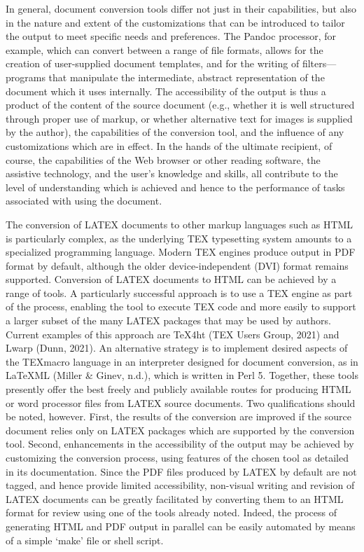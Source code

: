 \documentclass[11pt]{sig-alternate}
\begin{document}
\begin{large}
In general, document conversion tools differ not just in their capabilities, but also in the nature and extent of the customizations that can be introduced to tailor the output to meet specific needs and preferences. The Pandoc processor, for example, which can convert between a range of file formats, allows for the creation of user-supplied document templates, and for the writing of filters—programs that manipulate the intermediate, abstract representation of the document which it uses internally. The accessibility of the output is thus a product of the content of the source document (e.g., whether it is well structured through proper use of markup, or whether alternative text for images is supplied by the author), the capabilities of the conversion tool, and the influence of any customizations which are in effect. In the hands of the ultimate recipient, of course, the capabilities of the Web browser or other reading software, the assistive technology, and the user’s knowledge and skills, all contribute to the level of understanding which is achieved and hence to the performance of tasks associated with using the document.

The conversion of LATEX documents to other markup languages such as HTML is particularly complex, as the underlying TEX typesetting system amounts to a specialized programming language. Modern TEX engines produce output in PDF format by default, although the older device-independent (DVI) format remains supported. Conversion of LATEX documents to HTML can be achieved by a range of tools. A particularly successful approach is to use a TEX engine as part of the process, enabling the tool to execute TEX code and more easily to support a larger subset of the many LATEX packages that may be used by authors. Current examples of this approach are TeX4ht (TEX Users Group, 2021) and Lwarp (Dunn, 2021). An alternative strategy is to implement desired aspects of the TEXmacro language in an interpreter designed for document conversion, as in LaTeXML (Miller \& Ginev, n.d.), which is written in Perl 5. Together, these tools presently offer the best freely and publicly available routes for producing HTML or word processor files from LATEX source documents. Two qualifications should be noted, however. First, the results of the conversion are improved if the source document relies only on LATEX packages which are supported by the conversion tool. Second, enhancements in the accessibility of the output may be achieved by customizing the conversion process, using features of the chosen tool as detailed in its documentation. Since the PDF files produced by LATEX by default are not tagged, and hence provide limited accessibility, non-visual writing and revision of LATEX documents can be greatly facilitated by converting them to an HTML format for review using one of the tools already noted. Indeed, the process of generating HTML and PDF output in parallel can be easily automated by means of a simple ‘make’ file or shell script.


\end{large}
\end{document}
